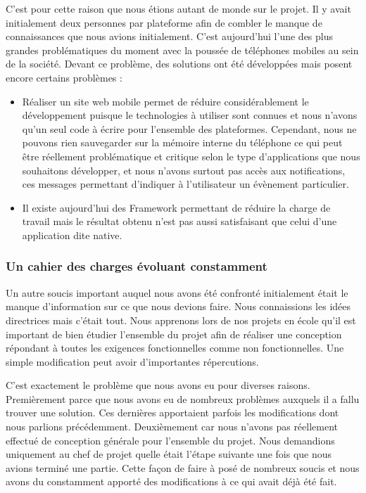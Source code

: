 \documentclass{article}
\begin{document}
		C'est pour cette raison que nous étions autant de monde sur le projet. Il y avait initialement deux personnes par plateforme afin de combler le manque de connaissances que nous avions initialement.  C'est aujourd'hui l'une des plus grandes problématiques du moment avec la poussée de téléphones mobiles au sein de la société. Devant ce problème, des solutions ont été développées mais posent encore certains problèmes : 
		\begin{itemize}
			\item Réaliser un site web mobile permet de réduire considérablement le développement puisque le technologies à utiliser sont connues et nous n'avons qu'un seul code à écrire pour l'ensemble des plateformes. Cependant, nous ne pouvons rien sauvegarder sur la mémoire interne du téléphone ce qui peut être réellement problématique et critique selon le type d'applications que nous souhaitons développer, et nous n'avons surtout pas accès aux notifications, ces messages permettant d'indiquer à l'utilisateur un évènement particulier. 
			\item Il existe aujourd'hui des Framework permettant de réduire la charge de travail mais le résultat obtenu n'est pas aussi satisfaisant que celui d'une application dite native.
		\end{itemize}
\subsubsection{Un cahier des charges évoluant constamment}
		Un autre soucis important auquel nous avons été confronté initialement était le manque d'information sur ce que nous devions faire. Nous connaissions les idées directrices mais c'était tout. Nous apprenons lors de nos projets en école qu'il est important de bien étudier l'ensemble du projet afin de réaliser une conception répondant à toutes les exigences fonctionnelles comme non fonctionnelles. Une simple modification peut avoir d'importantes répercutions. 
			
		C'est exactement le problème que nous avons eu pour diverses raisons. Premièrement parce que nous avons eu de nombreux problèmes auxquels il a fallu trouver une solution. Ces dernières apportaient parfois les modifications dont nous parlions précédemment. Deuxièmement car nous n'avons pas réellement effectué de conception générale pour l'ensemble du projet. Nous demandions uniquement au chef de projet quelle était l'étape suivante une fois que nous avions terminé une partie. Cette façon de faire à posé de nombreux soucis et nous avons du constamment apporté des modifications à ce qui avait déjà été fait.
		
\end{document}
